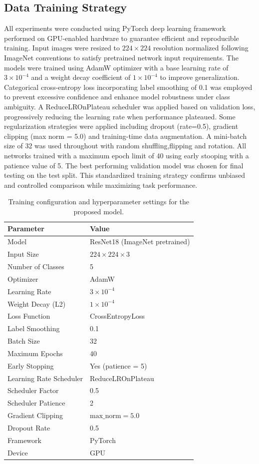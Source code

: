 \documentclass[conference,9pt]{IEEEtran}
\begin{document}
\subsection{Data Training Strategy}
       All experiments were conducted using PyTorch deep learning framework performed on GPU-enabled hardware to guarantee efficient and reproducible training. Input images were resized to $224 \times 224$ resolution normalized following ImageNet conventions to satisfy pretrained network input requirements. The models were trained using AdamW optimizer with a base learning rate of $3 \times 10^{-4}$ and a weight decay coefficient of $1 \times 10^{-4}$ to improve generalization. Categorical cross-entropy loss incorporating label smoothing of 0.1 was employed to prevent excessive confidence and enhance model robustness under class ambiguity. A ReduceLROnPlateau scheduler was applied based on validation loss, progressively reducing the learning rate when performance plateaued. Some regularization strategies were applied including dropout (rate=0.5), gradient clipping (max norm = 5.0) and training-time data augmentation. A mini-batch size of 32 was used throughout with random shuffling,flipping and rotation. All networks trained with a maximum epoch limit of 40 using early stooping with a patience value of 5. The best performing validation model was chosen for final testing on the test split. This standardized training strategy confirms unbiased and controlled comparison while maximizing task performance.
\begin{table}[H]
\centering
\caption{Training configuration and hyperparameter settings for the proposed model.}
\label{tab:training_config}
\begin{tabular}{l l}
\toprule
\textbf{Parameter} & \textbf{Value} \\
\midrule
Model & ResNet18 (ImageNet pretrained) \\
Input Size & $224 \times 224 \times 3$ \\
Number of Classes & 5 \\
Optimizer & AdamW \\
Learning Rate & $3 \times 10^{-4}$ \\
Weight Decay (L2) & $1 \times 10^{-4}$ \\
Loss Function & CrossEntropyLoss \\
Label Smoothing & 0.1 \\
Batch Size & 32 \\
Maximum Epochs & 40 \\
Early Stopping & Yes (patience = 5) \\
Learning Rate Scheduler & ReduceLROnPlateau \\
Scheduler Factor & 0.5 \\
Scheduler Patience & 2 \\
Gradient Clipping & $\text{max\_norm} = 5.0$ \\
Dropout Rate & 0.5 \\
Framework & PyTorch \\
Device & GPU \\
\bottomrule
\end{tabular}
\end{table}
\end{document}

